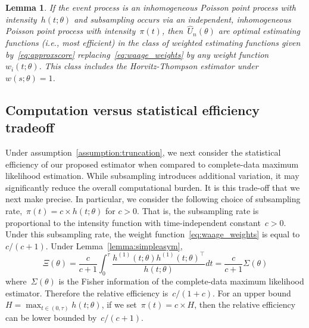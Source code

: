 \documentclass[12pt]{amsart}
\newtheorem{lemma}[thm]{Lemma}
\begin{document}
\begin{lemma} \normalfont
\label{prop:optimal}
If the event process is an inhomogeneous Poisson point process with intensity~$h(t; \theta)$ and subsampling occurs via an independent, inhomogeneous Poisson point process with intensity~$\pi (t)$, then~$\hat U_n (\theta)$ are optimal estimating functions (i.e., most efficient) in the class of weighted estimating functions given by~\eqref{eq:approxscore} replacing~\eqref{eq:waage_weights} by any weight function~$w_i (t; \theta)$. This class includes the Horvitz-Thompson estimator under~$w(s; \theta) = 1$.
\end{lemma}

\noindent

\subsection{Computation versus statistical efficiency tradeoff}
\label{section:tradeoff}

Under assumption~\ref{assumption:truncation}, we next consider the statistical efficiency of our proposed estimator when compared to complete-data maximum likelihood estimation. While subsampling introduces additional variation, it may significantly reduce the overall computational burden. It is this trade-off that we next make precise. In particular, we consider the following choice of subsampling rate,~$\pi(t) = c \times h(t; \theta)$ for $c>0$. That is, the subsampling rate is proportional to the intensity function with time-independent constant~$c > 0$. Under this subsampling rate, the weight function~\eqref{eq:waage_weights} is equal to $c/ (c+1)$. Under Lemma~\ref{lemma:simpleasym},
\[
\Xi (\theta) = \frac{c}{c+1} \int_0^\tau \frac{ h^{(1)} (t; \theta)
  h^{(1)} (t; \theta)^\top}{h (t; \theta)} dt = \frac{c}{c+1} \Sigma (\theta)
\]
where~$\Sigma(\theta)$ is the Fisher information of the complete-data maximum likelihood estimator.
Therefore the relative efficiency is~$c/(1+c)$. For an upper bound~$H = \max_{t \in (0,\tau)} h(t;\theta)$, if we set~$\pi (t) = c \times H$, then the relative efficiency can be lower bounded by~$c / (c+1)$.
\end{document}
